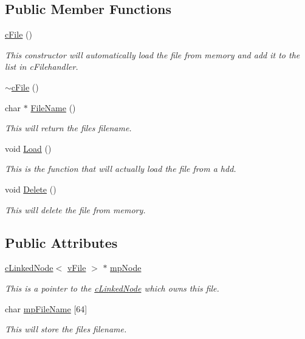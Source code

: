 \subsection*{Public Member Functions}
\begin{DoxyCompactItemize}
\item 
\hyperlink{classc_file_a5bb81f36e954af61b581e3c1fd06e0de}{cFile} ()
\begin{DoxyCompactList}\small\item\em This constructor will automatically load the file from memory and add it to the list in cFilehandler. \item\end{DoxyCompactList}\item 
\hyperlink{classc_file_aac7799c109a165b8f67c8be10ce91e1c}{$\sim$cFile} ()
\item 
char $\ast$ \hyperlink{classc_file_aafa7dfeb503f6c3946b82f3b29242ee5}{FileName} ()
\begin{DoxyCompactList}\small\item\em This will return the files filename. \item\end{DoxyCompactList}\item 
void \hyperlink{classc_file_aa5891f6208183a26e7fde7d8dee62ffc}{Load} ()
\begin{DoxyCompactList}\small\item\em This is the function that will actually load the file from a hdd. \item\end{DoxyCompactList}\item 
void \hyperlink{classc_file_ab2e74ccc027ccb92ea577cd7bb9b5f5c}{Delete} ()
\begin{DoxyCompactList}\small\item\em This will delete the file from memory. \item\end{DoxyCompactList}\end{DoxyCompactItemize}
\subsection*{Public Attributes}
\begin{DoxyCompactItemize}
\item 
\hyperlink{classc_linked_node}{cLinkedNode}$<$ \hyperlink{classv_file}{vFile} $>$ $\ast$ \hyperlink{classc_file_aed51bea596b50e6c8a03dd1593298681}{mpNode}
\begin{DoxyCompactList}\small\item\em This is a pointer to the \hyperlink{classc_linked_node}{cLinkedNode} which owns this file. \item\end{DoxyCompactList}\item 
char \hyperlink{classc_file_a5e3add41cacddcc489ca9aa185e3b066}{mpFileName} \mbox{[}64\mbox{]}
\begin{DoxyCompactList}\small\item\em This will store the files filename. \item\end{DoxyCompactList}\end{DoxyCompactItemize}
